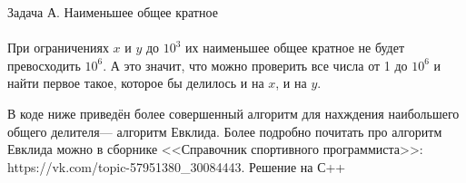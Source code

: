 {\large Задача А. Наименьшее общее кратное}
\\
\\
При ограничениях $x$ и $y$ до $10^3$ их наименьшее общее кратное не будет превосходить $10^6$. А это значит, что можно проверить все числа от 1 до $10^6$ и найти первое такое, которое бы делилось и на $x$, и на $y$.

В коде ниже приведён более совершенный алгоритм для нахждения наибольшего общего делителя--- алгоритм Евклида. Более подробно почитать про алгоритм Евклида можно в сборнике <<Справочник спортивного программиста>>: https://vk.com/topic-57951380\_30084443.
\newpage
{\large Решение на С++}
\\
\\

